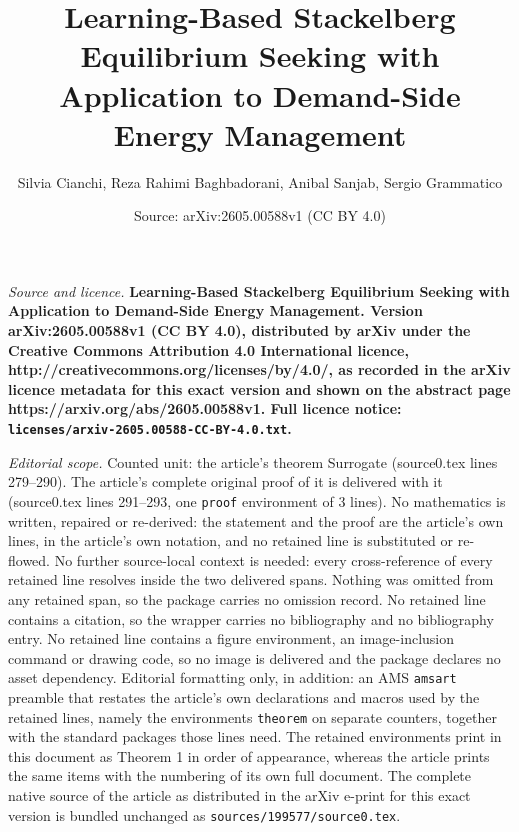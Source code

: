 \documentclass[10pt,a4paper]{amsart}
\title{\LARGE \bf Learning-Based Stackelberg Equilibrium Seeking with Application to Demand-Side Energy Management}
\author{Silvia Cianchi, Reza Rahimi Baghbadorani, Anibal Sanjab, Sergio Grammatico}
\date{Source: arXiv:2605.00588v1 (CC BY 4.0)}
\begin{document}
\maketitle

\noindent\emph{Source and licence.} \LARGE \bf Learning-Based Stackelberg Equilibrium Seeking with Application to Demand-Side Energy Management. Version arXiv:2605.00588v1 (CC BY 4.0), distributed by arXiv under the Creative Commons Attribution 4.0 International licence, http://creativecommons.org/licenses/by/4.0/, as recorded in the arXiv licence metadata for this exact version and shown on the abstract page https://arxiv.org/abs/2605.00588v1. Full licence notice: \texttt{licenses/arxiv-2605.00588-CC-BY-4.0.txt}.\par\smallskip

\noindent\textit{Editorial scope.} Counted unit: the article's theorem Surrogate (source0.tex lines 279--290). The article's complete original proof of it is delivered with it (source0.tex lines 291--293, one \texttt{proof} environment of 3 lines). No mathematics is written, repaired or re-derived: the statement and the proof are the article's own lines, in the article's own notation, and no retained line is substituted or re-flowed.  No further source-local context is needed: every cross-reference of every retained line resolves inside the two delivered spans.  Nothing was omitted from any retained span, so the package carries no omission record.  No retained line contains a citation, so the wrapper carries no bibliography and no bibliography entry.  No retained line contains a figure environment, an image-inclusion command or drawing code, so no image is delivered and the package declares no asset dependency.  Editorial formatting only, in addition: an AMS \texttt{amsart} preamble that restates the article's own declarations and macros used by the retained lines, namely the environments \texttt{theorem} on separate counters, together with the standard packages those lines need.  The retained environments print in this document as Theorem 1 in order of appearance, whereas the article prints the same items with the numbering of its own full document.  The complete native source of the article as distributed in the arXiv e-print for this exact version is bundled unchanged as \texttt{sources/199577/source0.tex}.
\end{document}
